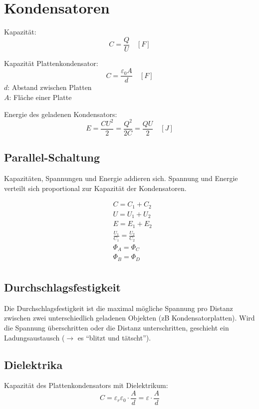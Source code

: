 \section{Kondensatoren}

Kapazität:
\[
	C = \frac{Q}{U} \quad \left[F\right]
\]

Kapazität Plattenkondensator:
\[
	C = \frac{\varepsilon_0 A}{d} \quad \left[F\right]
\]
$d$: Abstand zwischen Platten\\
$A$: Fläche einer Platte

Energie des geladenen Kondensators:
\[
	E = \frac{CU^2}{2} = \frac{Q^2}{2C} = \frac{QU}{2} \quad \left[J\right]
\]

\subsection{Parallel-Schaltung}

Kapazitäten, Spannungen und Energie addieren sich. Spannung und Energie verteilt
sich proportional zur Kapazität der Kondensatoren.

\begin{minipage}{.5\linewidth}
	
\end{minipage}
\begin{minipage}{.5\linewidth}
	\begin{align*}
		& C = C_1 + C_2 \\
		& U = U_1 + U_2 \\
		& E = E_1 + E_2 \\
		& \frac{U_1}{C_1} = \frac{U_2}{C_2} \\
		& \Phi_A = \Phi_C \\
		& \Phi_B = \Phi_D \\
	\end{align*}
\end{minipage}

\subsection{Durchschlagsfestigkeit}

Die Durchschlagsfestigkeit ist die maximal mögliche Spannung pro Distanz
zwischen zwei unterschiedlich geladenen Objekten (zB Kondensatorplatten). Wird
die Spannung überschritten oder die Distanz unterschritten, geschieht ein
Ladungsaustausch ($\rightarrow$ es "`blitzt und tätscht"').

\subsection{Dielektrika}

Kapazität des Plattenkondensators mit Dielektrikum:
\[
	C = \varepsilon_r \varepsilon_0 \cdot \frac{A}{d} = \varepsilon \cdot \frac{A}{d}
\]
